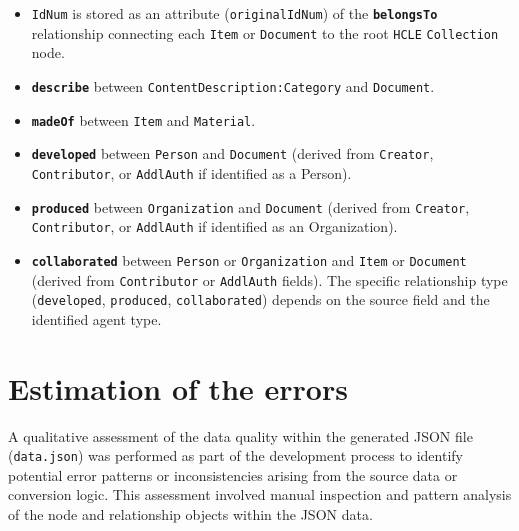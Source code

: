 \documentclass[11pt, a4paper]{article}
\begin{document}
\begin{itemize}
    \item \texttt{IdNum} is stored as an attribute (\texttt{originalIdNum}) of the \textbf{\texttt{belongsTo}} relationship connecting each \texttt{Item} or \texttt{Document} to the root \texttt{HCLE} \texttt{Collection} node.
    \item \textbf{\texttt{describe}} between \texttt{ContentDescription:Category} and \texttt{Document}.
    \item \textbf{\texttt{madeOf}} between \texttt{Item} and \texttt{Material}.
    \item \textbf{\texttt{developed}} between \texttt{Person} and \texttt{Document} (derived from \texttt{Creator}, \texttt{Contributor}, or \texttt{AddlAuth} if identified as a Person).
    \item \textbf{\texttt{produced}} between \texttt{Organization} and \texttt{Document} (derived from \texttt{Creator}, \texttt{Contributor}, or \texttt{AddlAuth} if identified as an Organization).
    \item \textbf{\texttt{collaborated}} between \texttt{Person} or \texttt{Organization} and \texttt{Item} or \texttt{Document} (derived from \texttt{Contributor} or \texttt{AddlAuth} fields). The specific relationship type (\texttt{developed}, \texttt{produced}, \texttt{collaborated}) depends on the source field and the identified agent type.
\end{itemize}

\section{Estimation of the errors}
A qualitative assessment of the data quality within the generated JSON file (\texttt{data.json}) was performed as part of the development process to identify potential error patterns or inconsistencies arising from the source data or conversion logic.
\newline
This assessment involved manual inspection and pattern analysis of the node and relationship objects within the JSON data.
\end{document}
